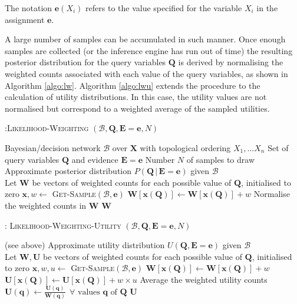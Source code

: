 The notation $\mathbf{e}(X_i)$ refers to the value specified for the variable $X_i$ in the assignment $\mathbf{e}$. 

A large number of samples can be accumulated in such manner. Once enough samples are collected (or the inference engine has run out of time) the resulting posterior distribution for the query variables $\mathbf{Q}$ is derived by normalising the weighted counts associated with each value of the query variables, as shown in Algorithm \ref{algo:lw}. Algorithm \ref{algo:lwu} extends the procedure to the calculation of utility distributions. In this case, the utility values are not normalised but correspond to a weighted average of the sampled utilities. 

\begin{algorithm}[h]
\begin{algorithmic} \vspace{2mm} 
\caption{:\textsc{Likelihood-Weighting} $(\mathcal{B},\mathbf{Q}, \mathbf{E}=\mathbf{e}, N)$}
\REQUIRE Bayesian/decision network $\mathcal{B}$ over $\mathbf{X}$ with topological ordering $X_1,...X_n$
\REQUIRE Set of query variables $\mathbf{Q}$ and evidence $\mathbf{E} =\mathbf{e}$
\REQUIRE Number $N$ of samples to draw
\ENSURE Approximate posterior distribution $P(\mathbf{Q} \, | \, \mathbf{E} =\mathbf{e})$ given $\mathcal{B}$ \\[2mm]
\STATE Let $\mathbf{W}$ be vectors of weighted counts for each possible value of $\mathbf{Q}$, initialised to zero
\STATE $\mathbf{x}, w \leftarrow $ \textsc{Get-Sample}$(\mathcal{B}, \mathbf{e})$ 
\STATE $\mathbf{W}[\mathbf{x}(\mathbf{Q})] \leftarrow \mathbf{W}[\mathbf{x}(\mathbf{Q})] + w$
\ENDFOR
\STATE Normalise the weighted counts in $\mathbf{W}$
\RETURN $\mathbf{W}$  \vspace{1mm} 
\end{algorithmic}
\label{algo:lw}
\end{algorithm}

\begin{algorithm}[h]
\begin{algorithmic} \vspace{2mm} 
\caption{: \textsc{Likelihood-Weighting-Utility} $(\mathcal{B},\mathbf{Q}, \mathbf{E}=\mathbf{e}, N)$}
\REQUIRE (see above)
\ENSURE Approximate utility distribution $U(\mathbf{Q}, \mathbf{E} =\mathbf{e})$ given $\mathcal{B}$ \\[2mm]
\STATE Let $\mathbf{W}, \mathbf{U}$ be vectors of weighted counts for each possible value of $\mathbf{Q}$, initialised to zero
\STATE $\mathbf{x}, w, u \leftarrow $ \textsc{Get-Sample}$(\mathcal{B}, \mathbf{e})$ 
\STATE $\mathbf{W}[\mathbf{x}(\mathbf{Q})] \leftarrow \mathbf{W}[\mathbf{x}(\mathbf{Q})] + w$
\STATE $\mathbf{U}[\mathbf{x}(\mathbf{Q})] \leftarrow \mathbf{U}[\mathbf{x}(\mathbf{Q})] + w \times u$
\ENDFOR
\STATE Average the weighted utility counts $\mathbf{U}(\mathbf{q}) \leftarrow \frac{\mathbf{U}(\mathbf{q})}{\mathbf{W}(\mathbf{q})} \ \ \forall \text{ values } \mathbf{q} \text{ of } \mathbf{Q}$ 
\RETURN $\mathbf{U}$  \vspace{1mm} 
\end{algorithmic}
\label{algo:lwu}
\end{algorithm}


